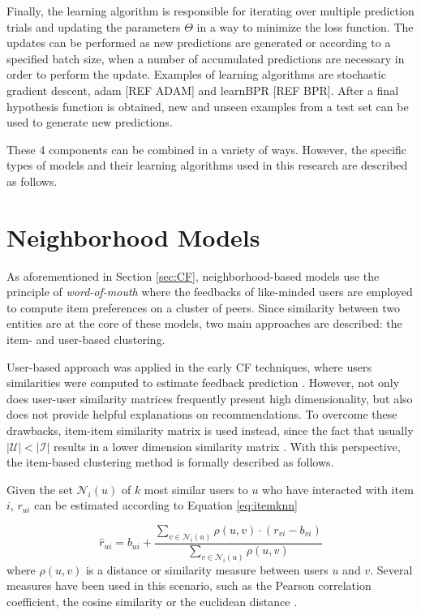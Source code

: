 Finally, the learning algorithm is responsible for iterating over multiple prediction trials and updating the parameters $\Theta$ in a way to minimize the loss function. The updates can be performed as new predictions are generated or according to a specified batch size, when a number of accumulated predictions are necessary in order to perform the update. Examples of learning algorithms are stochastic gradient descent, adam [REF ADAM] and learnBPR [REF BPR]. After a final hypothesis function is obtained, new and unseen examples from a test set can be used to generate new predictions. 

These 4 components can be combined in a variety of ways. However, the specific types of models and their learning algorithms used in this research are described as follows.

\section{Neighborhood Models}

As aforementioned in Section \ref{sec:CF}, neighborhood-based models use the principle of \textit{word-of-mouth} where the feedbacks of like-minded users are employed to compute item preferences on a cluster of peers. Since similarity between two entities are at the core of these models, two main approaches are described: the item- and user-based clustering.

User-based approach was applied in the early CF techniques, where users similarities were computed to estimate feedback prediction \cite{1999AlgorithmicFramework}. However, not only does user-user similarity matrices frequently present high dimensionality, but also does not provide helpful explanations on recommendations. To overcome these drawbacks, item-item similarity matrix is used instead, since the fact that usually $|\mathcal{U}| < |\mathcal{I}|$ results in a lower dimension similarity matrix \cite{2001sarwar}. With this perspective, the item-based clustering method is formally described as follows.

Given the set $\mathcal{N}_i(u)$ of $k$ most similar users to $u$ who have interacted with item $i$, $r_{ui}$ can be estimated according to Equation \ref{eq:itemknn}

\begin{equation} 
    \label{eq:itemknn}
    \hat{r}_{ui} = b_{ui} + \frac{\sum_{v \in \mathcal{N}_i(u)} \rho(u,v)\cdot (r_{vi}-b_{vi})}{\sum_{v \in \mathcal{N}_i(u)} \rho(u,v)}
\end{equation} where $\rho(u,v)$ is a distance or similarity measure between users $u$ and $v$. Several  measures have been used in this scenario, such as the Pearson correlation coefficient, the cosine similarity or the euclidean distance \cite{2010Handbook, 10.1145/3133264.3133299}.

